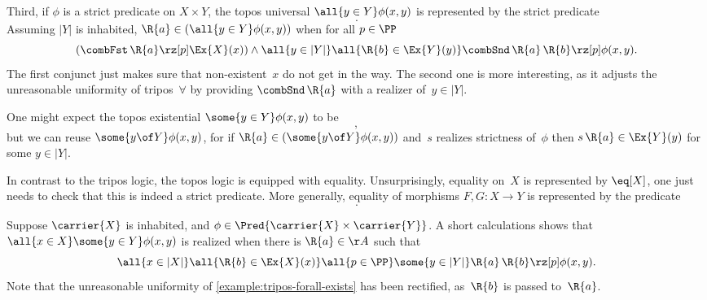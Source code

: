 Third, if $\phi$ is a strict predicate on $X \times Y$, the topos universal $\all{y \in Y} \phi(x, y)$ is represented by the strict predicate
%
\begin{equation*}
  [x \of X \mid \Ex{X}(x) \land \all{y \of |Y|} (\Ex{Y}(y) \limply \phi(x,y))].
\end{equation*}
%
Assuming $|Y|$ is inhabited, $\R{a} \in (\all{y \in Y} \phi(x, y))$ when for all $p \in \PP$
%
\begin{equation*}
  (\combFst \, \R{a} \rz[p] \Ex{X}(x))
  \land
  \all{y \in |Y|} \all{\R{b} \in \Ex{Y}(y)} \combSnd \, \R{a} \, \R{b} \rz[p] \phi(x, y).
\end{equation*}
%
The first conjunct just makes sure that non-existent~$x$ do not get in the way. The second one is more interesting, as it adjusts the unreasonable uniformity of tripos~$\forall$ by providing $\combSnd \, \R{a}$ with a realizer of~$y \in |Y|$.

One might expect the topos existential $\some{y \in Y} \phi(x, y)$ to be
%
\begin{equation*}
  [x \of X \such \some{y \of Y} \Ex{Y}(y) \land \phi(x, y)],
\end{equation*}
%
but we can reuse $\some{y \of Y} \phi(x, y)$, for if $\R{a} \in (\some{y \of Y} \phi(x, y))$
and~$s$ realizes strictness of~$\phi$ then $s \, \R{a} \in \Ex{Y}(y)$ for some $y \in |Y|$.

In contrast to the tripos logic, the topos logic is equipped with equality.
%
Unsurprisingly, equality on~$X$ is represented by $\eq[X]$, one just needs to check that this is indeed a strict predicate.
%
More generally, equality of morphisms $F, G : X \to Y$ is represented by the predicate
%
\begin{equation*}
  [x \of X \such \some{y \of Y} F(x, y) \land G(x, y)].
\end{equation*}

\begin{example}
  \label{example:topos-forall-exists}%
  Suppose $\carrier{X}$ is inhabited, and $\phi \in \Pred{\carrier{X} \times \carrier{Y}}$.
  A short calculations shows that $\all{x \in X} \some{y \in Y} \phi(x, y)$ is realized
  when there is $\R{a} \in \AA$ such that
  \begin{equation*}
    \all{x \in |X|}
    \all{\R{b} \in \Ex{X}(x)}
    \all{p \in \PP}
    \some{y \in |Y|}
    \R{a} \, \R{b} \rz[p] \phi(x, y).
  \end{equation*}
  Note that the unreasonable uniformity of \cref{example:tripos-forall-exists} has been rectified,
  as~$\R{b}$ is passed to~$\R{a}$.
\end{example}


